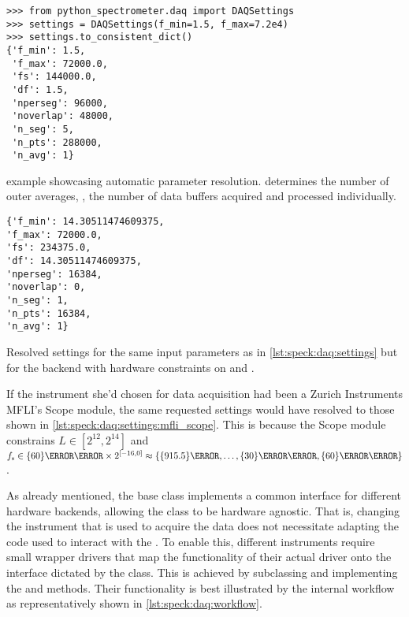 \begin{listing}[htpb]
    \begin{verbatim}
>>> from python_spectrometer.daq import DAQSettings
>>> settings = DAQSettings(f_min=1.5, f_max=7.2e4)
>>> settings.to_consistent_dict()
{'f_min': 1.5,
 'f_max': 72000.0,
 'fs': 144000.0,
 'df': 1.5,
 'nperseg': 96000,
 'noverlap': 48000,
 'n_seg': 5,
 'n_pts': 288000,
 'n_avg': 1}
    \end{verbatim}
    \caption{
         example showcasing automatic parameter resolution.
         determines the number of outer averages, \ie, the number of data buffers acquired and processed individually.
    }
    \label{lst:speck:daq:settings}
\end{listing}

\begin{marginlisting}[-2.5cm]
    \begin{verbatim}
{'f_min': 14.30511474609375,
'f_max': 72000.0,
'fs': 234375.0,
'df': 14.30511474609375,
'nperseg': 16384,
'noverlap': 0,
'n_seg': 1,
'n_pts': 16384,
'n_avg': 1}
    \end{verbatim}
    \caption[Resolved  for MFLI Scope]{
        Resolved settings for the same input parameters as in \cref{lst:speck:daq:settings} but for the  backend with hardware constraints on  and .
    }
    \label{lst:speck:daq:settings:mfli_scope}
\end{marginlisting}

If the instrument she'd chosen for data acquisition had been a Zurich Instruments MFLI's Scope module,
the same requested settings would have resolved to those shown in \cref{lst:speck:daq:settings:mfli_scope}.
This is because the Scope module constrains $L\in[2^{12},2^{14}]$ and $\fs\in\qty{60}{\mega\hertz}\times 2^{[-16, 0]} \approx \allowbreak \lbrace \qty{915.5}{\hertz}, \allowbreak \dotsc, \allowbreak \qty{30}{\mega\hertz}, \qty{60}{\mega\hertz}\rbrace$.

As already mentioned, the  base class implements a common interface for different hardware backends, allowing the  class to be hardware agnostic.
That is, changing the instrument that is used to acquire the data does not necessitate adapting the code used to interact with the .
To enable this, different instruments require small wrapper drivers that map the functionality of their actual driver onto the interface dictated by the  class.
This is achieved by subclassing  and implementing the  and  methods.
Their functionality is best illustrated by the internal workflow as representatively shown in \cref{lst:speck:daq:workflow}.

